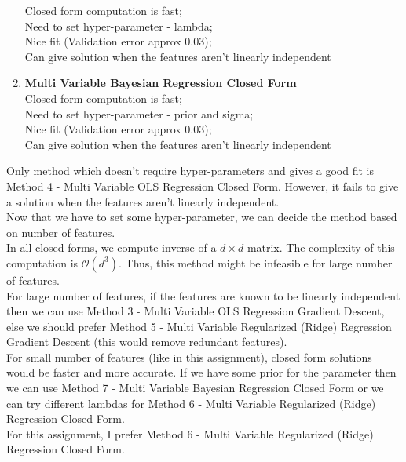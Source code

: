 \documentclass[12pt, fleqn]{article}
\begin{document}
\begin{enumerate}
        Closed form computation is fast; \\
        Need to set hyper-parameter - lambda; \\
        Nice fit (Validation error approx 0.03); \\
        Can give solution when the features aren't linearly independent
  \item \textbf{Multi Variable Bayesian Regression Closed Form} \\
        Closed form computation is fast; \\
        Need to set hyper-parameter - prior and sigma; \\
        Nice fit (Validation error approx 0.03); \\
        Can give solution when the features aren't linearly independent
\end{enumerate}

Only method which doesn't require hyper-parameters and gives a good fit is Method 4 - Multi Variable OLS Regression Closed Form. However, it fails to give a solution when the features aren't linearly independent. \\

Now that we have to set some hyper-parameter, we can decide the method based on number of features. \\
In all closed forms, we compute inverse of a $d \times d$ matrix. The complexity of this computation is $\mathcal{O}(d^3)$. Thus, this method might be infeasible for large number of features. \\

For large number of features, if the features are known to be linearly independent then we can use Method 3 - Multi Variable OLS Regression Gradient Descent, else we should prefer Method 5 - Multi Variable Regularized (Ridge) Regression Gradient Descent (this would remove redundant features). \\

For small number of features (like in this assignment), closed form solutions would be faster and more accurate. If we have some prior for the parameter then we can use Method 7 - Multi Variable Bayesian Regression Closed Form or we can try different lambdas for Method 6 - Multi Variable Regularized (Ridge) Regression Closed Form. \\

For this assignment, I prefer Method 6 - Multi Variable Regularized (Ridge) Regression Closed Form.
\end{document}

